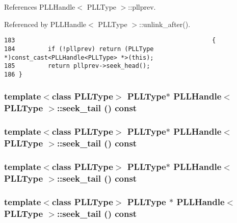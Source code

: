 References PLLHandle$<$ PLLType $>$::pllprev.

Referenced by PLLHandle$<$ PLLType $>$::unlink\_\-after().



\footnotesize\begin{verbatim}183                                                      { 
184         if (!pllprev) return (PLLType *)const_cast<PLLHandle<PLLType> *>(this); 
185         return pllprev->seek_head(); 
186 } 
\end{verbatim}\normalsize 
{}
\subsubsection{\setlength{\rightskip}{0pt plus 5cm}template$<$class PLLType$>$ {\bf PLLType}$\ast$ PLLHandle$<$ {\bf PLLType} $>$::seek\_\-tail () const\hspace{0.3cm}{\tt  [inline]}}\label{classPLLHandle_a46}


\subsubsection{\setlength{\rightskip}{0pt plus 5cm}template$<$class PLLType$>$ {\bf PLLType}$\ast$ PLLHandle$<$ {\bf PLLType} $>$::seek\_\-tail () const\hspace{0.3cm}{\tt  [inline]}}\label{classPLLHandle_a33}


\subsubsection{\setlength{\rightskip}{0pt plus 5cm}template$<$class PLLType$>$ {\bf PLLType}$\ast$ PLLHandle$<$ {\bf PLLType} $>$::seek\_\-tail () const\hspace{0.3cm}{\tt  [inline]}}\label{classPLLHandle_a20}


\subsubsection{\setlength{\rightskip}{0pt plus 5cm}template$<$class PLLType$>$ {\bf PLLType} $\ast$ PLLHandle$<$ {\bf PLLType} $>$::seek\_\-tail () const\hspace{0.3cm}{\tt  [inline]}}\label{classPLLHandle_a7}




